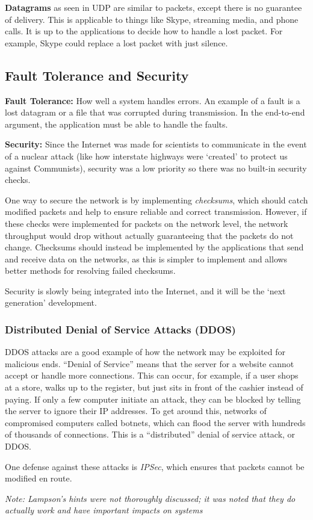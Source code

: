 \documentclass[twoside]{article}
\begin{document}
\textbf{Datagrams} as seen in UDP are similar to packets, except there is no
guarantee of delivery. This is applicable to things like Skype, streaming media,
and phone calls. It is up to the applications to decide how to handle a lost
packet. For example, Skype could replace a lost packet with just silence.

\subsection{Fault Tolerance and Security}

\textbf{Fault Tolerance:} How well a system handles errors. An example of a
fault is a lost datagram or a file that was corrupted during transmission. In
the end-to-end argument, the application must be able to handle the faults.

\textbf{Security:}
Since the Internet was made for scientists to communicate in the event of a
nuclear attack (like how interstate highways were `created' to protect us
against Communists), security was a low priority so there was no built-in
security checks.

One way to secure the network is by implementing \emph{checksums}, which should
catch modified packets and help to ensure reliable and correct transmission.
However, if these checks were implemented for packets on the network level, the
network throughput would drop without actually guaranteeing that the packets do
not change. Checksums should instead be implemented by the applications that
send and receive data on the networks, as this is simpler to implement and
allows better methods for resolving failed checksums.

Security is slowly being integrated into the Internet, and it will be the `next
generation' development.

\subsubsection{Distributed Denial of Service Attacks (DDOS)}

DDOS attacks are a good example of how the network may be exploited for
malicious ends. ``Denial of Service'' means that the server for a website cannot
accept or handle more connections. This can occur, for example, if a user shops
at a store, walks up to the register, but just sits in front of the cashier
instead of paying. If only a few computer initiate an attack, they can be
blocked by telling the server to ignore their IP addresses. To get around this,
networks of compromised computers called botnets, which can flood the server
with hundreds of thousands of connections. This is a ``distributed'' denial of
service attack, or DDOS.

One defense against these attacks is \emph{IPSec}, which ensures that packets
cannot be modified en route.

\emph{Note: Lampson's hints were not thoroughly discussed; it was noted that
they do actually work and have important impacts on systems} 
\end{document}
